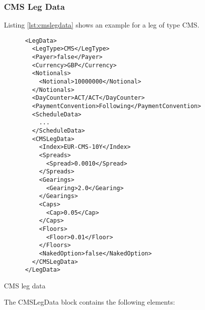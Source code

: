 \subsubsection{CMS Leg Data}
\label{ss:cmslegdata}

Listing \ref{lst:cmslegdata} shows an example for a leg of type CMS. 

\begin{listing}[H]
\begin{verbatim}
      <LegData>
        <LegType>CMS</LegType>
        <Payer>false</Payer>
        <Currency>GBP</Currency>
        <Notionals>
          <Notional>10000000</Notional>
        </Notionals>
        <DayCounter>ACT/ACT</DayCounter>
        <PaymentConvention>Following</PaymentConvention>
        <ScheduleData>
          ...
        </ScheduleData>
        <CMSLegData>
          <Index>EUR-CMS-10Y</Index>
          <Spreads>
            <Spread>0.0010</Spread>
          </Spreads>
          <Gearings>
            <Gearing>2.0</Gearing>
          </Gearings>
          <Caps>
            <Cap>0.05</Cap>
          </Caps>
          <Floors>
            <Floor>0.01</Floor>
          </Floors>
          <NakedOption>false</NakedOption>
        </CMSLegData>
      </LegData>
\end{verbatim}
\caption{CMS leg data}
\label{lst:cmslegdata}
\end{listing}

The CMSLegData block contains the following elements:

